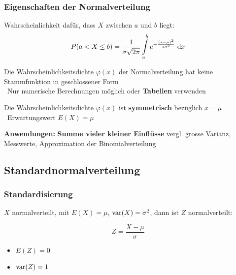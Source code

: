 \subsubsection{Eigenschaften der Normalverteilung}


\vspace{0.1cm}

Wahrscheinlichkeit dafür, dass $X$ zwischen $a$ und $b$ liegt:
$$ P(a < X \leq b) = \frac{1}{\sigma \sqrt{2 \pi}} \int\limits_a^b e^{- \frac{(x - \mu)^2}{2 \sigma^2}}  \, \mathop{} \! \mathrm{d} x $$



\vspace{0.1cm}

Die Wahrscheinlichkeitsdichte $\varphi(x)$ der Normalverteilung hat keine Stammfunktion in geschlossener Form\\ 
\textrightarrow\ Nur numerische Berechnungen möglich oder \textbf{Tabellen} verwenden

\vspace{0.2cm}


\vspace{0.1cm}

Die Wahrscheinlichkeitsdichte $\varphi(x)$ ist \textbf{symmetrisch} bezüglich $x = \mu$ \\
\textrightarrow\ Erwartungswert $E(X) = \mu$


\vspace{0.15cm}
\textbf{Anwendungen:} \textbf{Summe vieler kleiner Einflüsse} vergl. grosse Varianz, Messwerte, Approximation der Binomialverteilung


\subsection{Standardnormalverteilung}

\subsubsection{Standardisierung}

$X$ normalverteilt, mit $E(X) = \mu$, $\mathrm{var}(X) = \sigma^2$, dann ist $Z$ normalverteilt:

\vspace{0.2cm}

\begin{minipage}[t]{0.48\columnwidth}
	$$ \boxed{ Z = \frac{X - \mu}{\sigma} } $$
\end{minipage}
\hfill
\begin{minipage}[t]{0.48\columnwidth}

	\vspace{0.1cm}

	\begin{itemize}
		\item $E(Z) = 0$
		\item $\mathrm{var}(Z) = 1$
	\end{itemize}
\end{minipage}

